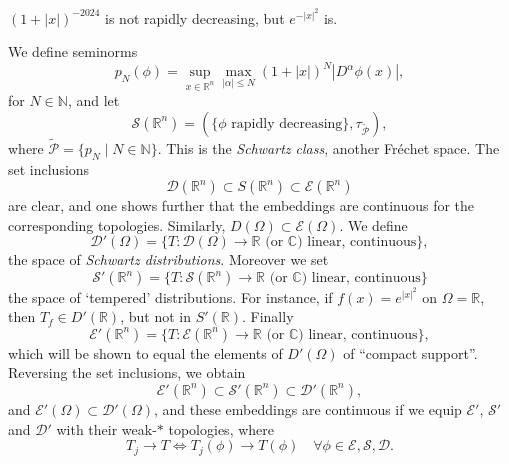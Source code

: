 \documentclass[12pt]{article}
\begin{document}
\begin{exbox}
	$(1 + |x|)^{-2024}$ is not rapidly decreasing, but $e^{-|x|^2}$ is.
\end{exbox}

We define seminorms
\[
p_N(\phi) = \sup_{x \in \mathbb{R}^n} \max_{|\alpha| \leq N}(1 + |x|)^N |D^\alpha \phi(x)|,
\]
for $N \in \mathbb{N}$, and let
\[
	\mathcal{S}(\mathbb{R}^n) = (\{\phi \text{ rapidly decreasing}\}, \tau_{\mathcal{\tilde P}}),
\]
where $\mathcal{\tilde P} = \{p_N \mid N \in \mathbb{N}\}$. This is the \emph{Schwartz class}, another Fr\'echet space. The set inclusions
\[
\mathcal{D}(\mathbb{R}^n) \subset S(\mathbb{R}^n) \subset \mathcal{E}(\mathbb{R}^n)
\]
are clear, and one shows further that the embeddings are continuous for the corresponding topologies. Similarly, $D(\Omega) \subset \mathcal{E}(\Omega)$. We define
\[
	\mathcal{D}'(\Omega) = \{T : \mathcal{D}(\Omega) \to \mathbb{R} \text{ (or $\mathbb{C}$) linear, continuous}\},
\]
the space of \emph{Schwartz distributions}. Moreover we set
\[
	\mathcal{S}'(\mathbb{R}^n) = \{T : \mathcal{S}(\mathbb{R}^n) \to \mathbb{R} \text{ (or $\mathbb{C}$) linear, continuous}\}
\]
the space of `tempered' distributions. For instance, if $f(x) = e^{|x|^2}$ on $\Omega = \mathbb{R}$, then $T_f \in D'(\mathbb{R})$, but not in $S'(\mathbb{R})$. Finally
\[
	\mathcal{E}'(\mathbb{R}^n) = \{T : \mathcal{E}(\mathbb{R}^n) \to \mathbb{R} \text{ (or $\mathbb{C}$) linear, continuous}\},
\]
which will be shown to equal the elements of $D'(\Omega)$ of ``compact support''. Reversing the set inclusions, we obtain
\[
\mathcal{E}'(\mathbb{R}^n) \subset \mathcal{S}'(\mathbb{R}^n) \subset \mathcal{D}'(\mathbb{R}^n),
\]
and $\mathcal{E}'(\Omega) \subset \mathcal{D}'(\Omega)$, and these embeddings are continuous if we equip $\mathcal{E}'$, $\mathcal{S}'$ and $\mathcal{D}'$ with their weak-$\ast$ topologies, where
\[
	T_j \to T \iff T_j(\phi) \to T(\phi) \quad \forall \phi \in \mathcal{E}, \mathcal{S}, \mathcal{D}.
\]
\end{document}
